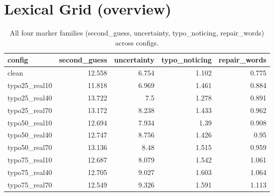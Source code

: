 \documentclass[11pt]{article}
\begin{document}
\section*{Lexical Grid (overview)}
\begin{table}[H]
\centering
\caption{All four marker families (second\_guess, uncertainty, typo\_noticing, repair\_words) across configs.}
\small
\begin{adjustbox}{max width=\textwidth}
\begin{tabular}{lrrrr}
\toprule
\textbf{config} & \textbf{second\_guess} & \textbf{uncertainty} & \textbf{typo\_noticing} & \textbf{repair\_words} \\
\midrule
clean & 12.558 & 6.754 & 1.102 & 0.775 \\
typo25\_real10 & 11.818 & 6.969 & 1.461 & 0.884 \\
typo25\_real40 & 13.722 & 7.5 & 1.278 & 0.891 \\
typo25\_real70 & 13.172 & 8.238 & 1.433 & 0.962 \\
typo50\_real10 & 12.694 & 7.934 & 1.39 & 0.908 \\
typo50\_real40 & 12.747 & 8.756 & 1.426 & 0.95 \\
typo50\_real70 & 13.136 & 8.48 & 1.515 & 0.959 \\
typo75\_real10 & 12.687 & 8.079 & 1.542 & 1.061 \\
typo75\_real40 & 12.705 & 9.027 & 1.603 & 1.064 \\
typo75\_real70 & 12.549 & 9.326 & 1.591 & 1.113 \\
\bottomrule
\end{tabular}
\end{adjustbox}
\end{table}
\end{document}
